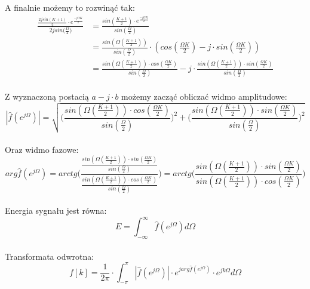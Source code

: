 \documentclass[11pt,a4paper]{article}
\numberwithin{liczba1}{liczba2}
\begin{document}
A finalnie możemy to rozwinąć tak:
\begin{equation}
\begin{split}
\frac{\frac{2j sin(K+1)}{2} \cdot e^{\frac{-j\Omega K}{2}}}{2j sin({\frac{\Omega}{2})}}
&{} = \frac{sin(\frac{K+1}{2}) \cdot e^{\frac{-j\Omega K}{2}}}{sin(\frac{\Omega}{2})} \\
&{} = \frac{sin(\Omega(\frac{K+1}{2}))}{sin(\frac{\Omega}{2})} \cdot (cos (\frac{\Omega K}{2}) - j \cdot sin (\frac{\Omega K}{2})) \\
&{} = \frac{sin(\Omega (\frac{K+1}{2})) \cdot cos(\frac{\Omega K}{2})}{sin(\frac{\Omega}{2})} - j \cdot \frac{sin(\Omega(\frac{K+1}{2})) \cdot sin(\frac{\Omega K}{2})}{sin(\frac{\Omega}{2})}
\end{split}
\end{equation} \\

Z wyznaczoną postacią $ a - j \cdot b $ możemy zacząć obliczać widmo amplitudowe:
\begin{equation}
| \hat{f}(e^{j\Omega}) | = \sqrt{\Bigg(\frac{sin(\Omega (\frac{K+1}{2})) \cdot cos(\frac{\Omega K}{2})}{sin(\frac{\Omega}{2})}\Bigg)^2 + \Bigg(\frac{sin(\Omega(\frac{K+1}{2})) \cdot sin(\frac{\Omega K}{2})}{sin(\frac{\Omega}{2})}\Bigg)^2}
\end{equation} \\

Oraz widmo fazowe:
\begin{equation}
arg \hat{f}(e^{j\Omega}) = arctg \Bigg(\frac{\frac{sin(\Omega(\frac{K+1}{2})) \cdot sin(\frac{\Omega K}{2})}{sin(\frac{\Omega}{2})}}{\frac{sin(\Omega (\frac{K+1}{2})) \cdot cos(\frac{\Omega K}{2})}{sin(\frac{\Omega}{2})}}\Bigg) = arctg \Bigg(\frac{sin(\Omega(\frac{K+1}{2})) \cdot sin(\frac{\Omega K}{2})}{sin(\Omega (\frac{K+1}{2})) \cdot cos(\frac{\Omega K}{2})}\Bigg)
\end{equation} \\

Energia sygnału jest równa:
\begin{equation}
E = \int_{-\infty}^{\infty} \hat{f}(e^{j\Omega}) d\Omega
\end{equation} \\

Transformata odwrotna:
\begin{equation}
f[k] = \frac{1}{2\pi} \cdot \int_{-\pi}^{\pi} | \hat{f}(e^{j\Omega}) | \cdot e^{j arg \hat{f}(e^{j\Omega})} \cdot e^{jk\Omega} d\Omega
\end{equation} \\
\end{document}
